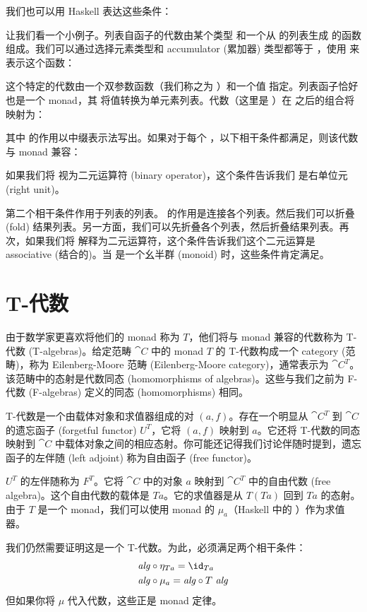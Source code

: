 \noindent
我们也可以用 Haskell 表达这些条件：

让我们看一个小例子。列表自函子的代数由某个类型  和一个从  的列表生成  的函数组成。我们可以通过选择元素类型和 accumulator (累加器) 类型都等于 ，使用  来表示这个函数：

这个特定的代数由一个双参数函数（我们称之为 ）和一个值  指定。列表函子恰好也是一个 monad，其  将值转换为单元素列表。代数（这里是 ）在  之后的组合将  映射为：

其中  的作用以中缀表示法写出。如果对于每个 ，以下相干条件都满足，则该代数与 monad 兼容：

如果我们将  视为二元运算符 (binary operator)，这个条件告诉我们  是右单位元 (right unit)。

第二个相干条件作用于列表的列表。 的作用是连接各个列表。然后我们可以折叠 (fold) 结果列表。另一方面，我们可以先折叠各个列表，然后折叠结果列表。再次，如果我们将  解释为二元运算符，这个条件告诉我们这个二元运算是 associative (结合的)。当  是一个幺半群 (monoid) 时，这些条件肯定满足。

\section{T-代数}

由于数学家更喜欢将他们的 monad 称为 $T$，他们将与 monad 兼容的代数称为 T-代数 (T-algebras)。给定范畴 $\cat{C}$ 中的 monad $T$ 的 T-代数构成一个 category (范畴)，称为 Eilenberg-Moore 范畴 (Eilenberg-Moore category)，通常表示为 $\cat{C}^T$。该范畴中的态射是代数同态 (homomorphisms of algebras)。这些与我们之前为 F-代数 (F-algebras) 定义的同态 (homomorphisms) 相同。

T-代数是一个由载体对象和求值器组成的对 $(a, f)$。存在一个明显从 $\cat{C}^T$ 到 $\cat{C}$ 的遗忘函子 (forgetful functor) $U^T$，它将 $(a, f)$ 映射到 $a$。它还将 T-代数的同态映射到 $\cat{C}$ 中载体对象之间的相应态射。你可能还记得我们讨论伴随时提到，遗忘函子的左伴随 (left adjoint) 称为自由函子 (free functor)。

$U^T$ 的左伴随称为 $F^T$。它将 $\cat{C}$ 中的对象 $a$ 映射到 $\cat{C}^T$ 中的自由代数 (free algebra)。这个自由代数的载体是 $T a$。它的求值器是从 $T (T a)$ 回到 $T a$ 的态射。由于 $T$ 是一个 monad，我们可以使用 monad 的 $\mu_a$（Haskell 中的 ）作为求值器。

我们仍然需要证明这是一个 T-代数。为此，必须满足两个相干条件：
\begin{align*}
  \mathit{alg} & \circ \eta_{Ta} = \id_{Ta}     \\
  \mathit{alg} & \circ \mu_a = \mathit{alg} \circ T\ \mathit{alg}
\end{align*}
但如果你将 $\mu$ 代入代数，这些正是 monad 定律。

